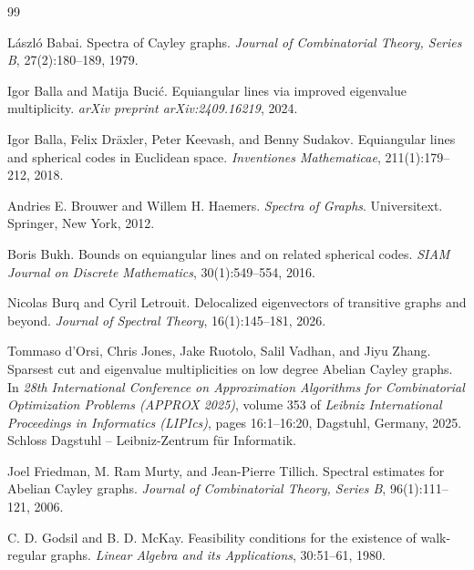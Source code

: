 \documentclass[11pt]{article}
\theoremstyle{definition}
\theoremstyle{remark}
\begin{document}
\begin{thebibliography}{99}

L{\'a}szl{\'o} Babai.
\newblock Spectra of {Cayley} graphs.
\newblock \emph{Journal of Combinatorial Theory, Series B}, 27(2):180--189, 1979.

Igor Balla and Matija Buci{\'c}.
\newblock Equiangular lines via improved eigenvalue multiplicity.
\newblock \emph{arXiv preprint arXiv:2409.16219}, 2024.

Igor Balla, Felix Dr{\"a}xler, Peter Keevash, and Benny Sudakov.
\newblock Equiangular lines and spherical codes in {Euclidean} space.
\newblock \emph{Inventiones Mathematicae}, 211(1):179--212, 2018.

Andries E. Brouwer and Willem H. Haemers.
\newblock \emph{Spectra of Graphs}.
\newblock Universitext. Springer, New York, 2012.

Boris Bukh.
\newblock Bounds on equiangular lines and on related spherical codes.
\newblock \emph{SIAM Journal on Discrete Mathematics}, 30(1):549--554, 2016.

Nicolas Burq and Cyril Letrouit.
\newblock Delocalized eigenvectors of transitive graphs and beyond.
\newblock \emph{Journal of Spectral Theory}, 16(1):145--181, 2026.

Tommaso d'Orsi, Chris Jones, Jake Ruotolo, Salil Vadhan, and Jiyu Zhang.
\newblock Sparsest cut and eigenvalue multiplicities on low degree {Abelian Cayley} graphs.
\newblock In \emph{28th International Conference on Approximation Algorithms for Combinatorial Optimization Problems (APPROX 2025)}, volume 353 of \emph{Leibniz International Proceedings in Informatics (LIPIcs)}, pages 16:1--16:20, Dagstuhl, Germany, 2025. Schloss Dagstuhl -- Leibniz-Zentrum f{\"u}r Informatik.

Joel Friedman, M. Ram Murty, and Jean-Pierre Tillich.
\newblock Spectral estimates for {Abelian Cayley} graphs.
\newblock \emph{Journal of Combinatorial Theory, Series B}, 96(1):111--121, 2006.

C. D. Godsil and B. D. McKay.
\newblock Feasibility conditions for the existence of walk-regular graphs.
\newblock \emph{Linear Algebra and its Applications}, 30:51--61, 1980.


\end{thebibliography}
\end{document}
